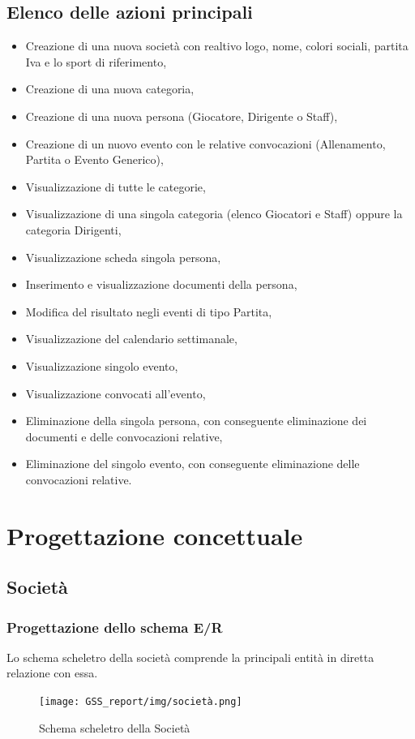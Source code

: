 \documentclass[a4paper,12pt]{report}
\begin{document}
\section{Elenco delle azioni principali}
\begin{itemize}
    \item Creazione di una nuova società con realtivo logo, nome, colori sociali, partita Iva e lo sport di riferimento,
    \item Creazione di una nuova categoria,
    \item Creazione di una nuova persona (Giocatore, Dirigente o Staff),
    \item Creazione di un nuovo evento con le relative convocazioni (Allenamento, Partita o Evento Generico),
    \item Visualizzazione di tutte le categorie,
    \item Visualizzazione di una singola categoria (elenco Giocatori e Staff) oppure la categoria Dirigenti,
    \item Visualizzazione scheda singola persona,
    \item Inserimento e visualizzazione documenti della persona,
    \item Modifica del risultato negli eventi di tipo Partita,
    \item Visualizzazione del calendario settimanale,
    \item Visualizzazione singolo evento,
    \item Visualizzazione convocati all'evento,
    \item Eliminazione della singola persona, con conseguente eliminazione dei documenti e delle convocazioni relative,
    \item Eliminazione del singolo evento, con conseguente eliminazione delle convocazioni relative.
\end{itemize}


\chapter{Progettazione concettuale}
\section{Società}
\subsection{Progettazione dello schema E/R}
Lo schema scheletro della società comprende la principali entità in diretta relazione con essa.
\newline
\begin{figure}[htp]
    \centering
    \texttt{[image: GSS\_report/img/società.png]}
    \caption{Schema scheletro della Società}
\end{figure}
\end{document}
